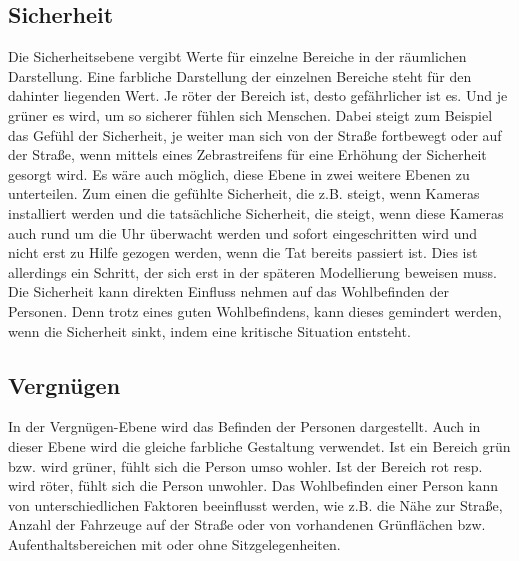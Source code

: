 \documentclass[10pt]{scrartcl}
\begin{document}
\subsection{Sicherheit}
Die Sicherheitsebene vergibt Werte für einzelne Bereiche in der räumlichen Darstellung. Eine farbliche Darstellung der einzelnen Bereiche steht für den dahinter liegenden Wert. Je röter der Bereich ist, desto gefährlicher ist es. Und je grüner es wird, um so sicherer fühlen sich Menschen. Dabei steigt zum Beispiel das Gefühl der Sicherheit, je weiter man sich von der Straße fortbewegt oder auf der Straße, wenn mittels eines Zebrastreifens für eine Erhöhung der Sicherheit gesorgt wird.
\newline Es wäre auch möglich, diese Ebene in zwei weitere Ebenen zu unterteilen. Zum einen die gefühlte Sicherheit, die z.B. steigt, wenn Kameras installiert werden und die tatsächliche Sicherheit, die steigt, wenn diese Kameras auch rund um die Uhr überwacht werden und sofort eingeschritten wird und nicht erst zu Hilfe gezogen werden, wenn die Tat bereits passiert ist. Dies ist allerdings ein Schritt, der sich erst in der späteren Modellierung beweisen muss.
\newline Die Sicherheit kann direkten Einfluss nehmen auf das Wohlbefinden der Personen. Denn trotz eines guten Wohlbefindens, kann dieses gemindert werden, wenn die Sicherheit sinkt, indem eine kritische Situation entsteht.

\subsection{Vergnügen}
In der Vergnügen-Ebene wird das Befinden der Personen dargestellt. Auch in dieser Ebene wird die gleiche farbliche Gestaltung verwendet. Ist ein Bereich grün bzw. wird grüner, fühlt sich die Person umso wohler. Ist der Bereich rot resp. wird röter, fühlt sich die Person unwohler. Das Wohlbefinden einer Person kann von unterschiedlichen Faktoren beeinflusst werden, wie z.B. die Nähe zur Straße, Anzahl der Fahrzeuge auf der Straße oder von vorhandenen Grünflächen bzw. Aufenthaltsbereichen mit oder ohne Sitzgelegenheiten.
\end{document}
